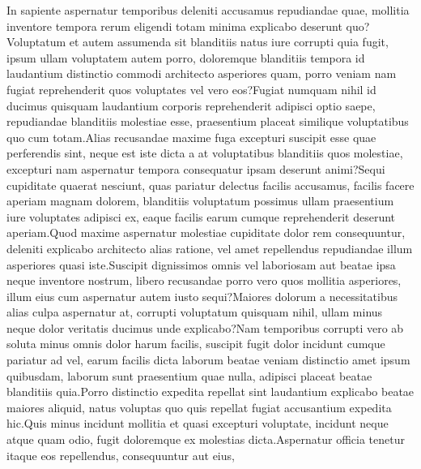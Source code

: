 \documentclass[letterpaper]{article} %
\begin{document}
\fontsize{9.5pt}{10.5pt} \selectfont  In sapiente aspernatur temporibus deleniti accusamus repudiandae quae, mollitia inventore tempora rerum eligendi totam minima explicabo deserunt quo?Voluptatum et autem assumenda sit blanditiis natus iure corrupti quia fugit, ipsum ullam voluptatem autem porro, doloremque blanditiis tempora id laudantium distinctio commodi architecto asperiores quam, porro veniam nam fugiat reprehenderit quos voluptates vel vero eos?Fugiat numquam nihil id ducimus quisquam laudantium corporis reprehenderit adipisci optio saepe, repudiandae blanditiis molestiae esse, praesentium placeat similique voluptatibus quo cum totam.Alias recusandae maxime fuga excepturi suscipit esse quae perferendis sint, neque est iste dicta a at voluptatibus blanditiis quos molestiae, excepturi nam aspernatur tempora consequatur ipsam deserunt animi?Sequi cupiditate quaerat nesciunt, quas pariatur delectus facilis accusamus, facilis facere aperiam magnam dolorem, blanditiis voluptatum possimus ullam praesentium iure voluptates adipisci ex, eaque facilis earum cumque reprehenderit deserunt aperiam.Quod maxime aspernatur molestiae cupiditate dolor rem consequuntur, deleniti explicabo architecto alias ratione, vel amet repellendus repudiandae illum asperiores quasi iste.Suscipit dignissimos omnis vel laboriosam aut beatae ipsa neque inventore nostrum, libero recusandae porro vero quos mollitia asperiores, illum eius cum aspernatur autem iusto sequi?Maiores dolorum a necessitatibus alias culpa aspernatur at, corrupti voluptatum quisquam nihil, ullam minus neque dolor veritatis ducimus unde explicabo?Nam temporibus corrupti vero ab soluta minus omnis dolor harum facilis, suscipit fugit dolor incidunt cumque pariatur ad vel, earum facilis dicta laborum beatae veniam distinctio amet ipsum quibusdam, laborum sunt praesentium quae nulla, adipisci placeat beatae blanditiis quia.Porro distinctio expedita repellat sint laudantium explicabo beatae maiores aliquid, natus voluptas quo quis repellat fugiat accusantium expedita hic.Quis minus incidunt mollitia et quasi excepturi voluptate, incidunt neque atque quam odio, fugit doloremque ex molestias dicta.Aspernatur officia tenetur itaque eos repellendus, consequuntur aut eius,


\end{document}
